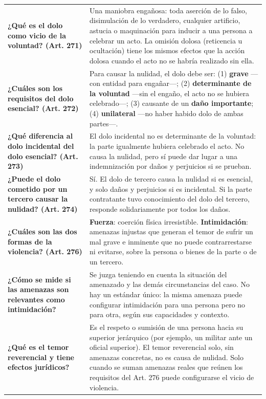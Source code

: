 \documentclass[12pt,oneside]{book}
\begin{document}
\begin{table}[H]
\begin{tabularx}{\textwidth}{
    >{\raggedright\arraybackslash}p{}
    >{\raggedright\arraybackslash}X
}
\textbf{¿Qué es el dolo como vicio de la voluntad? (Art. 271)} &
Una maniobra engañosa: toda aserción de lo falso, disimulación de lo verdadero, cualquier artificio, astucia o maquinación para inducir a una persona a celebrar un acto. La omisión dolosa (reticencia u ocultación) tiene los mismos efectos que la acción dolosa cuando el acto no se habría realizado sin ella. \\[6pt]

\textbf{¿Cuáles son los requisitos del dolo esencial? (Art. 272)} &
Para causar la nulidad, el dolo debe ser: (1) \textbf{grave} ---con entidad para engañar---; (2) \textbf{determinante de la voluntad} ---sin el engaño, el acto no se hubiera celebrado---; (3) causante de un \textbf{daño importante}; (4) \textbf{unilateral} ---no haber habido dolo de ambas partes---. \\[6pt]

\textbf{¿Qué diferencia al dolo incidental del dolo esencial? (Art. 273)} &
El dolo incidental no es determinante de la voluntad: la parte igualmente hubiera celebrado el acto. No causa la nulidad, pero sí puede dar lugar a una indemnización por daños y perjuicios si se prueban. \\[6pt]

\textbf{¿Puede el dolo cometido por un tercero causar la nulidad? (Art. 274)} &
Sí. El dolo de tercero causa la nulidad si es esencial, y solo daños y perjuicios si es incidental. Si la parte contratante tuvo conocimiento del dolo del tercero, responde solidariamente por todos los daños. \\[6pt]

\textbf{¿Cuáles son las dos formas de la violencia? (Art. 276)} &
\textbf{Fuerza}: coerción física irresistible. \textbf{Intimidación}: amenazas injustas que generan el temor de sufrir un mal grave e inminente que no puede contrarrestarse ni evitarse, sobre la persona o bienes de la parte o de un tercero. \\[6pt]

\textbf{¿Cómo se mide si las amenazas son relevantes como intimidación?} &
Se juzga teniendo en cuenta la situación del amenazado y las demás circunstancias del caso. No hay un estándar único: la misma amenaza puede configurar intimidación para una persona pero no para otra, según sus capacidades y contexto. \\[6pt]

\textbf{¿Qué es el temor reverencial y tiene efectos jurídicos?} &
Es el respeto o sumisión de una persona hacia su superior jerárquico (por ejemplo, un militar ante un oficial superior). El temor reverencial solo, sin amenazas concretas, no es causa de nulidad. Solo cuando se suman amenazas reales que reúnen los requisitos del Art. 276 puede configurarse el vicio de violencia. \\[6pt]


\end{tabularx}
\end{table}
\end{document}
